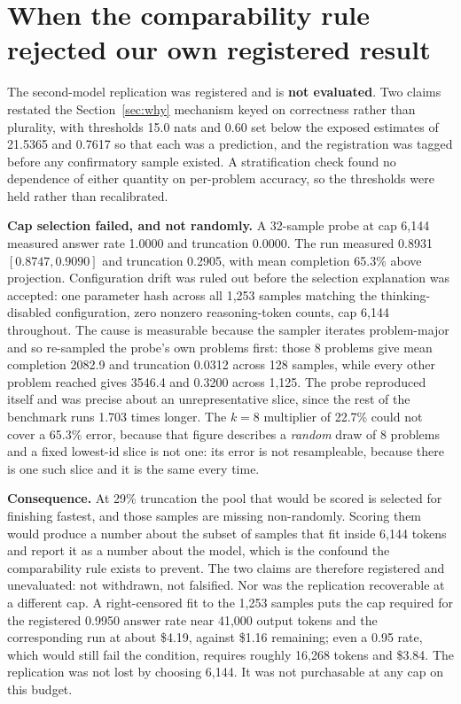 \documentclass{article}
\begin{document}
\section{When the comparability rule rejected our own registered result}
\label{sec:rejected}

The second-model replication was registered and is \textbf{not evaluated}. Two
claims restated the Section~\ref{sec:why} mechanism keyed on correctness rather
than plurality, with thresholds 15.0 nats and 0.60 set below the exposed
estimates of 21.5365 and 0.7617 so that each was a prediction, and the
registration was tagged before any confirmatory sample existed. A stratification
check found no dependence of either quantity on per-problem accuracy, so the
thresholds were held rather than recalibrated.

\textbf{Cap selection failed, and not randomly.} A 32-sample probe at cap 6,144
measured answer rate 1.0000 and truncation 0.0000. The run measured 0.8931
$[0.8747, 0.9090]$ and truncation 0.2905, with mean completion 65.3\% above
projection. Configuration drift was ruled out before the selection explanation
was accepted: one parameter hash across all 1,253 samples matching the
thinking-disabled configuration, zero nonzero reasoning-token counts, cap 6,144
throughout. The cause is measurable because the sampler iterates problem-major
and so re-sampled the probe's own problems first: those 8 problems give mean
completion 2082.9 and truncation 0.0312 across 128 samples, while every other
problem reached gives 3546.4 and 0.3200 across 1,125. The probe reproduced
itself and was precise about an unrepresentative slice, since the rest of the
benchmark runs 1.703 times longer. The $k=8$ multiplier of 22.7\% could not
cover a 65.3\% error, because that figure describes a \emph{random} draw of 8
problems and a fixed lowest-id slice is not one: its error is not resampleable,
because there is one such slice and it is the same every time.

\textbf{Consequence.} At 29\% truncation the pool that would be scored is
selected for finishing fastest, and those samples are missing non-randomly.
Scoring them would produce a number about the subset of samples that fit inside
6,144 tokens and report it as a number about the model, which is the confound
the comparability rule exists to prevent. The two claims are therefore
registered and unevaluated: not withdrawn, not falsified. Nor was the
replication recoverable at a different cap. A right-censored fit to the 1,253
samples puts the cap required for the registered 0.9950 answer rate near 41,000
output tokens and the corresponding run at about \$4.19, against \$1.16
remaining; even a 0.95 rate, which would still fail the condition, requires
roughly 16,268 tokens and \$3.84. The replication was not lost by choosing
6,144. It was not purchasable at any cap on this budget.
\end{document}

